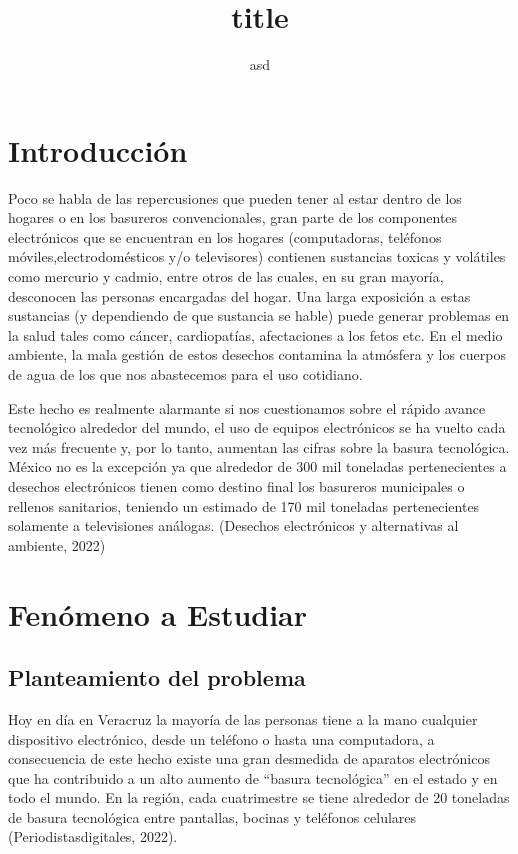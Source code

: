 \documentclass[letterpaper,12pt]{article}
\title{title}
\author{asd}
\begin{document}
\maketitle
\thispagestyle{empty}
\newpage
\thispagestyle{empty}
\tableofcontents %
\newpage
\setcounter{page}{1}
\pagestyle{headings}

\begin{sloppypar}
\section{Introducción}
Poco se habla de las repercusiones que pueden tener al estar dentro de los hogares o en los basureros convencionales, gran parte de los componentes electrónicos que se encuentran en los hogares (computadoras, teléfonos móviles,electrodomésticos y/o televisores) contienen sustancias toxicas y volátiles como mercurio y cadmio, entre otros de las cuales, en su gran mayoría, desconocen las personas encargadas del hogar. Una larga exposición a estas sustancias (y dependiendo de que sustancia se hable) puede generar problemas en la salud tales como cáncer, cardiopatías, afectaciones a los fetos etc. En el medio ambiente, la mala gestión de estos desechos contamina la atmósfera y los cuerpos de agua de los que nos abastecemos para el uso cotidiano.

Este hecho es realmente alarmante si nos cuestionamos sobre el rápido avance tecnológico alrededor del mundo, el uso de equipos electrónicos se ha vuelto cada vez más frecuente y, por lo tanto, aumentan las cifras sobre la basura tecnológica. México no es la excepción ya que alrededor de 300 mil toneladas pertenecientes a desechos electrónicos tienen como destino final los basureros municipales o rellenos sanitarios, teniendo un estimado de 170 mil toneladas pertenecientes solamente a televisiones análogas. (Desechos electrónicos y alternativas al ambiente, 2022)
\newpage
\section{Fenómeno a Estudiar}
\subsection{Planteamiento del problema}
Hoy en día en Veracruz la mayoría de las personas tiene a la mano cualquier dispositivo electrónico, desde un teléfono o hasta una computadora, a consecuencia de este hecho existe una gran desmedida de aparatos electrónicos que ha contribuido a un alto aumento de “basura tecnológica” en el estado y en todo el mundo. En la región, cada cuatrimestre se tiene alrededor de 20 toneladas de basura tecnológica entre pantallas, bocinas y teléfonos celulares (Periodistasdigitales, 2022). 


\end{sloppypar}
\end{document}
